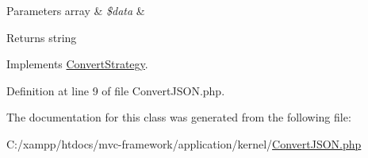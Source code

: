 \begin{DoxyParams}[1]{Parameters}
array & {\em \$data} & \\
\hline
\end{DoxyParams}
\begin{DoxyReturn}{Returns}
string 
\end{DoxyReturn}


Implements \hyperlink{interface_convert_strategy_a41444ea294bbd35a6c07ef4e9faeae10}{Convert\+Strategy}.



Definition at line 9 of file Convert\+J\+S\+O\+N.\+php.




The documentation for this class was generated from the following file\+:\begin{DoxyCompactItemize}
\item 
C\+:/xampp/htdocs/mvc-\/framework/application/kernel/\hyperlink{_convert_j_s_o_n_8php}{Convert\+J\+S\+O\+N.\+php}\end{DoxyCompactItemize}
